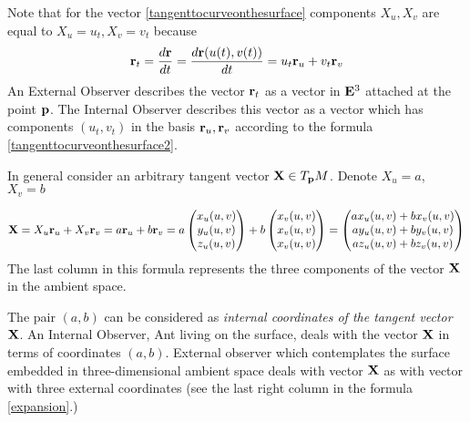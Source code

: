\documentclass[12pt]{article}
\theoremstyle{theorem}
\numberwithin{equation}{section}
\begin{document}
Note that for the vector \eqref{tangenttocurveonthesurface}
components $X_u, X_v$ are equal to  $X_u=u_t, X_v=v_t$  because
\begin{equation}\label{tangenttocurveonthesurface2}
  {\bf r}_t={d{\bf r}\over dt}={d{\bf r}(u(t),v(t))\over dt}=u_t{\bf r}_u+v_t{\bf r}_v
\end{equation}
  An  External Observer describes the vector ${\bf r}_t$ as a vector in ${\bf E}^3$
attached at the point ${\bf p}$.
The Internal Observer describes this vector
as a vector which has components
$(u_t,v_t)$ in the basis ${\bf r}_u,{\bf r}_v$ according to the formula
\eqref{tangenttocurveonthesurface2}.

In general consider an arbitrary tangent vector ${\bf X}\in T_{\bf p} M$.
Denote $X_u=a$, $X_v=b$

\begin{equation}\label{expansion}
  {\bf X}=X_u{\bf r}_u+X_v{\bf r}_v=a{\bf r}_u+b{\bf r}_v
         =a
\begin{pmatrix}
              x_u(u,v)\\
               y_u(u,v)\\
                z_u(u,v)\\
  \end{pmatrix}+b
\begin{pmatrix}
         x_v(u,v)\\
           x_v(u,v)\\
           x_v(u,v)\\
  \end{pmatrix}=
\begin{pmatrix}
              ax_u(u,v)+bx_v(u,v)\\
               ay_u(u,v)+by_v(u,v)\\
                az_u(u,v)+bz_v(u,v)\\
  \end{pmatrix}
\end{equation}
The last column in this formula represents the three components of the vector ${\bf X}$ in the ambient space.

The pair $(a,b)$ can be considered as {\it internal coordinates of the tangent vector ${\bf X}$}.
An Internal Observer, Ant living on the surface, deals with the vector ${\bf X}$ in terms of coordinates $(a,b)$.
External observer which contemplates the surface embedded in three-dimensional ambient space
 deals with vector ${\bf X}$ as with vector with three external coordinates
 (see the last right column in the formula \eqref{expansion}.)
\end{document}
